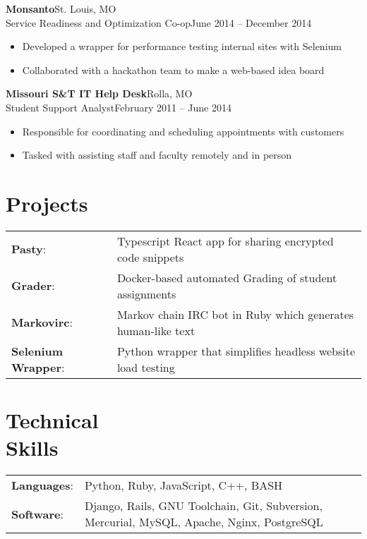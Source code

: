 \documentclass[margin]{res}
\newcommand{\github}[0]%
{%
  \hspace{-4mm}\faGithubSign\hspace{1mm}%
}
\begin{document}
\begin{resume}
       \textbf{Monsanto}\hfill St. Louis, MO\\
       Service Readiness and Optimization Co-op\hfill June 2014 -- December 2014
       \begin{itemize} \itemsep -1pt  %
         \item Developed a wrapper for performance testing internal sites with Selenium
         \item Collaborated with a hackathon team to make a web-based idea board
       \end{itemize}

       \textbf{Missouri S\&T IT Help Desk}\hfill Rolla, MO\\
       Student Support Analyst\hfill February 2011 -- June 2014
       \begin{itemize} \itemsep -1pt  %
         \item Responsible for coordinating and scheduling appointments with customers
         \item Tasked with assisting staff and faculty remotely and in person
       \end{itemize}

    \section{Projects}
      \begin{tabular}{l p{4in}}
        \github\textbf{Pasty}:                & Typescript React app for sharing encrypted code snippets \\ [1pt]
        \github\textbf{Grader}:               & Docker-based automated Grading of student assignments \\ [1pt]
        \github\textbf{Markovirc}:            & Markov chain IRC bot in Ruby which generates human-like text \\ [1pt]
        \github\textbf{Selenium Wrapper}:     & Python wrapper that simplifies headless website load testing \\ [1pt]
      \end{tabular}

    \section{Technical \\ Skills}
      \begin{tabular}{l p{3.6in}}
        \textbf{Languages}:                   & Python, Ruby, JavaScript, C++, BASH \\ [1pt]
        \textbf{Software}:                    & Django, Rails, GNU Toolchain, Git, Subversion, Mercurial, MySQL, Apache, Nginx, PostgreSQL \\ [1pt]
      \end{tabular}

  \end{resume}
\end{document}
